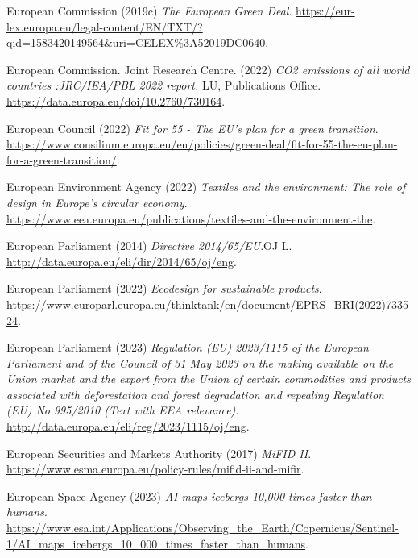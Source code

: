 \documentclass[
  letterpaper,
  DIV=11,
  numbers=noendperiod]{scrartcl}
\newlength{\cslhangindent}
\newenvironment{CSLReferences}[2] %
 {\begin{list}{}{%
  \setlength{\itemindent}{0pt}
  \setlength{\leftmargin}{0pt}
  \setlength{\parsep}{0pt}
  \ifodd #1
   \setlength{\leftmargin}{\cslhangindent}
   \setlength{\itemindent}{-1\cslhangindent}
  \fi
  \setlength{\itemsep}{#2\baselineskip}}}
 {\end{list}}
\begin{document}
\begin{CSLReferences}{0}{1}
European Commission (2019c) \emph{The {European Green Deal}}.
\url{https://eur-lex.europa.eu/legal-content/EN/TXT/?qid=1583420149564&uri=CELEX\%3A52019DC0640}.

European Commission. Joint Research Centre. (2022) \emph{{CO2} emissions
of all world countries :{JRC}/{IEA}/{PBL} 2022 report.} LU, Publications
Office. \url{https://data.europa.eu/doi/10.2760/730164}.

European Council (2022) \emph{Fit for 55 - {The EU}'s plan for a green
transition}.
\url{https://www.consilium.europa.eu/en/policies/green-deal/fit-for-55-the-eu-plan-for-a-green-transition/}.

European Environment Agency (2022) \emph{Textiles and the environment:
The role of design in {Europe}'s circular economy}.
\url{https://www.eea.europa.eu/publications/textiles-and-the-environment-the}.

European Parliament (2014) \emph{Directive 2014/65/{EU}}.OJ L.
\url{http://data.europa.eu/eli/dir/2014/65/oj/eng}.

European Parliament (2022) \emph{Ecodesign for sustainable products}.
\url{https://www.europarl.europa.eu/thinktank/en/document/EPRS_BRI(2022)733524}.

European Parliament (2023) \emph{Regulation ({EU}) 2023/1115 of the
{European Parliament} and of the {Council} of 31 {May} 2023 on the
making available on the {Union} market and the export from the {Union}
of certain commodities and products associated with deforestation and
forest degradation and repealing {Regulation} ({EU}) {No} 995/2010
({Text} with {EEA} relevance)}.
\url{http://data.europa.eu/eli/reg/2023/1115/oj/eng}.

European Securities and Markets Authority (2017) \emph{{MiFID II}}.
\url{https://www.esma.europa.eu/policy-rules/mifid-ii-and-mifir}.

European Space Agency (2023) \emph{{AI} maps icebergs 10,000 times
faster than humans}.
\url{https://www.esa.int/Applications/Observing_the_Earth/Copernicus/Sentinel-1/AI_maps_icebergs_10_000_times_faster_than_humans}.


\end{CSLReferences}
\end{document}
